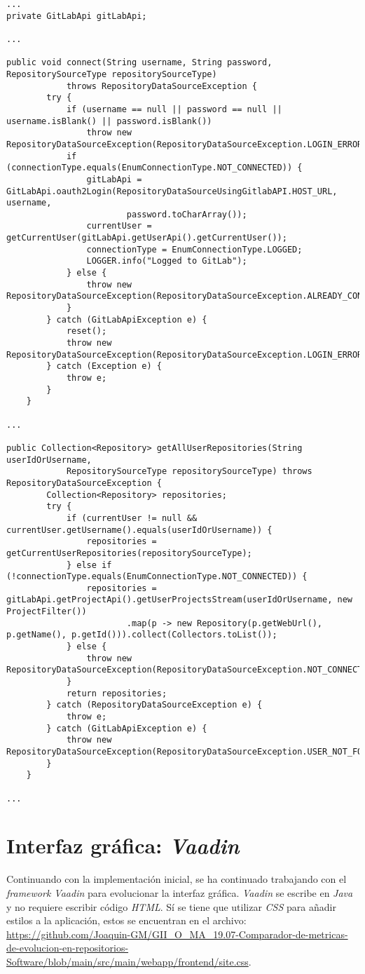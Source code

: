 \begin{minipage}{\linewidth}
{\tiny
\begin{verbatim}
...
private GitLabApi gitLabApi;

...

public void connect(String username, String password, RepositorySourceType repositorySourceType)
			throws RepositoryDataSourceException {
		try {
			if (username == null || password == null || username.isBlank() || password.isBlank())
				throw new RepositoryDataSourceException(RepositoryDataSourceException.LOGIN_ERROR);
			if (connectionType.equals(EnumConnectionType.NOT_CONNECTED)) {
				gitLabApi = GitLabApi.oauth2Login(RepositoryDataSourceUsingGitlabAPI.HOST_URL, username,
						password.toCharArray());
				currentUser = getCurrentUser(gitLabApi.getUserApi().getCurrentUser());
				connectionType = EnumConnectionType.LOGGED;
				LOGGER.info("Logged to GitLab");
			} else {
				throw new RepositoryDataSourceException(RepositoryDataSourceException.ALREADY_CONNECTED);
			}
		} catch (GitLabApiException e) {
			reset();
			throw new RepositoryDataSourceException(RepositoryDataSourceException.LOGIN_ERROR);
		} catch (Exception e) {
			throw e;
		}
	}

...

public Collection<Repository> getAllUserRepositories(String userIdOrUsername,
			RepositorySourceType repositorySourceType) throws RepositoryDataSourceException {
		Collection<Repository> repositories;
		try {
			if (currentUser != null && currentUser.getUsername().equals(userIdOrUsername)) {
				repositories = getCurrentUserRepositories(repositorySourceType);
			} else if (!connectionType.equals(EnumConnectionType.NOT_CONNECTED)) {
				repositories = gitLabApi.getProjectApi().getUserProjectsStream(userIdOrUsername, new ProjectFilter())
						.map(p -> new Repository(p.getWebUrl(), p.getName(), p.getId())).collect(Collectors.toList());
			} else {
				throw new RepositoryDataSourceException(RepositoryDataSourceException.NOT_CONNECTED);
			}
			return repositories;
		} catch (RepositoryDataSourceException e) {
			throw e;
		} catch (GitLabApiException e) {
			throw new RepositoryDataSourceException(RepositoryDataSourceException.USER_NOT_FOUND);
		}
	}
	
...
\end{verbatim}
}
\end{minipage}

\newpage
\section{Interfaz gráfica: \textit{Vaadin}}
Continuando con la implementación inicial, se ha continuado trabajando con el \textit{framework Vaadin} para evolucionar la interfaz gráfica. \textit{Vaadin} se escribe en \textit{Java} y no requiere escribir código \textit{HTML}. Sí se tiene que utilizar \textit{CSS} para añadir estilos a la aplicación, estos se encuentran en el archivo: 
\url{https://github.com/Joaquin-GM/GII_O_MA_19.07-Comparador-de-metricas-de-evolucion-en-repositorios-Software/blob/main/src/main/webapp/frontend/site.css}.

